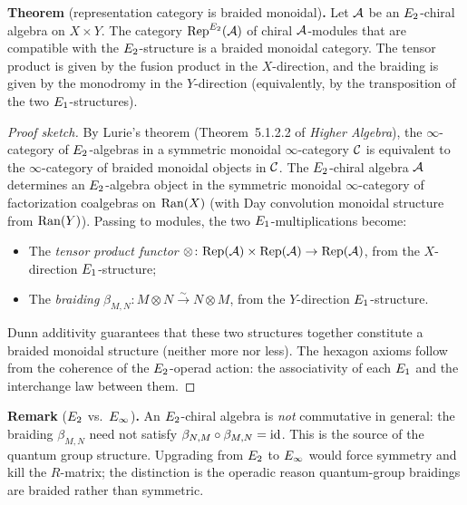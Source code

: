 \medskip
\noindent\textbf{Theorem} (representation category is braided monoidal)\textbf{.}\;
Let $\mathcal{A}$ be an $E_2$-chiral algebra on $X \times Y$. The category
$\mathrm{Rep}^{E_2}(\mathcal{A})$ of chiral $\mathcal{A}$-modules that are compatible with the
$E_2$-structure is a braided monoidal category. The tensor product is
given by the fusion product in the $X$-direction, and the braiding is
given by the monodromy in the $Y$-direction (equivalently, by the
transposition of the two $E_1$-structures).

\begin{proof}[Proof sketch]
By Lurie's theorem (Theorem~5.1.2.2 of \emph{Higher Algebra}), the
$\infty$-category of $E_2$-algebras in a symmetric monoidal
$\infty$-category $\mathcal{C}$ is equivalent to the $\infty$-category of
braided monoidal objects in $\mathcal{C}$. The $E_2$-chiral algebra $\mathcal{A}$
determines an $E_2$-algebra object in the symmetric monoidal
$\infty$-category of factorization coalgebras on $\mathrm{Ran}(X)$
(with Day convolution monoidal structure from $\mathrm{Ran}(Y)$).
Passing to modules, the two $E_1$-multiplications become:
\begin{itemize}
 \item The \emph{tensor product functor}
 $\otimes \colon \mathrm{Rep}(\mathcal{A}) \times \mathrm{Rep}(\mathcal{A}) \to \mathrm{Rep}(\mathcal{A})$,
 from the $X$-direction $E_1$-structure;
 \item The \emph{braiding}
 $\beta_{M,N}\colon M \otimes N \xrightarrow{\sim} N \otimes M$,
 from the $Y$-direction $E_1$-structure.
\end{itemize}
Dunn additivity guarantees that these two structures together constitute
a braided monoidal structure (neither more nor less). The hexagon
axioms follow from the coherence of the $E_2$-operad action: the
associativity of each $E_1$ and the interchange law between them.
\end{proof}

\medskip
\noindent\textbf{Remark} ($E_2$ vs.\ $E_\infty$)\textbf{.}
An $E_2$-chiral algebra is \emph{not} commutative in general: the
braiding $\beta_{M,N}$ need not satisfy $\beta_{N,M} \circ \beta_{M,N}
= \mathrm{id}$. This is the source of the quantum group structure. Upgrading
from $E_2$ to $E_\infty$ would force symmetry and kill the $R$-matrix;
the distinction is the operadic reason quantum-group braidings are
braided rather than symmetric.



